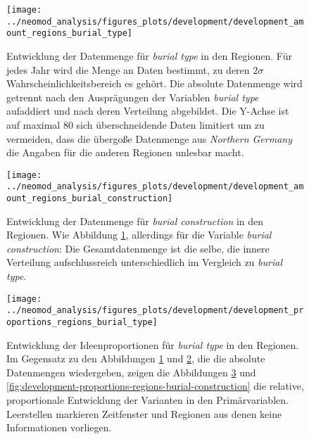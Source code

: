 \documentclass[openany,twoside,twocolumn]{book}
\begin{document}
\begin{figure}[!t]

{\centering \texttt{[image: ../neomod\_analysis/figures\_plots/development/development\_amount\_regions\_burial\_type]} 

}

\caption[Entwicklung der Datenmenge für \textit{burial type} in den Regionen]{Entwicklung der Datenmenge für \textit{burial type} in den Regionen. Für jedes Jahr wird die Menge an Daten bestimmt, zu deren $2\sigma$ Wahrscheinlichkeitsbereich es gehört. Die absolute Datenmenge wird getrennt nach den Ausprägungen der Variablen \textit{burial type} aufaddiert und nach deren Verteilung abgebildet. Die Y-Achse ist auf maximal 80 sich überschneidende Daten limitiert um zu vermeiden, dass die übergoße Datenmenge aus \textit{Northern Germany} die Angaben für die anderen Regionen unlesbar macht.}\label{fig:development-amount-regions-burial-type}
\end{figure}

\begin{figure}[!t]

{\centering \texttt{[image: ../neomod\_analysis/figures\_plots/development/development\_amount\_regions\_burial\_construction]} 

}

\caption[Entwicklung der Datenmenge für \textit{burial construction} in den Regionen]{Entwicklung der Datenmenge für \textit{burial construction} in den Regionen. Wie Abbildung \ref{fig:development-amount-regions-burial-type}, allerdings für die Variable \textit{burial construction}: Die Gesamtdatenmenge ist die selbe, die innere Verteilung aufschlussreich unterschiedlich im Vergleich zu \textit{burial type}.}\label{fig:development-amount-regions-burial-construction}
\end{figure}

\begin{figure}[!t]

{\centering \texttt{[image: ../neomod\_analysis/figures\_plots/development/development\_proportions\_regions\_burial\_type]} 

}

\caption[Entwicklung der Ideenproportionen für \textit{burial type} in den Regionen]{Entwicklung der Ideenproportionen für \textit{burial type} in den Regionen. Im Gegensatz zu den Abbildungen \ref{fig:development-amount-regions-burial-type} und \ref{fig:development-amount-regions-burial-construction}, die die absolute Datenmengen wiedergeben, zeigen die Abbildungen \ref{fig:development-proportions-regions-burial-type} und \ref{fig:development-proportions-regions-burial-construction} die relative, proportionale Entwicklung der Varianten in den Primärvariablen. Leerstellen markieren Zeitfenster und Regionen aus denen keine Informationen vorliegen.}\label{fig:development-proportions-regions-burial-type}
\end{figure}
\end{document}
